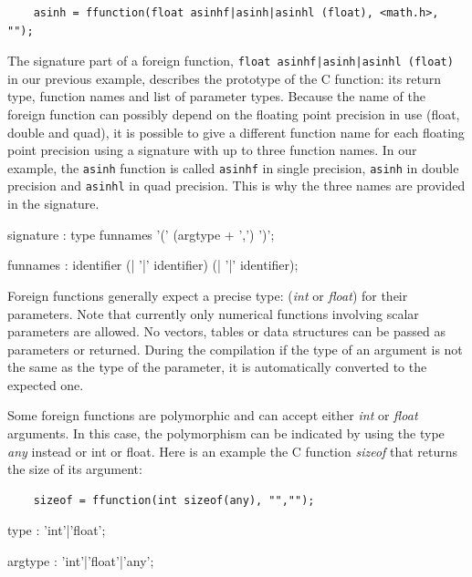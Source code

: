 \begin{lstlisting}
	asinh = ffunction(float asinhf|asinh|asinhl (float), <math.h>, "");
\end{lstlisting}


The signature part of a foreign function, \lstinline'float asinhf|asinh|asinhl (float)' in our previous example, describes the prototype of the C function: its return type, function names and list of parameter types. Because the name of the foreign function can possibly depend on the floating point precision in use (float, double and quad), it is possible to give a different function name for each floating point precision using a signature with up to three function names. In our example, the \lstinline'asinh' function is called \lstinline'asinhf' in single precision, \lstinline'asinh' in double precision and \lstinline'asinhl' in quad precision. This is why the three names are provided in the signature.


\begin{rail}
signature : type funnames '(' (argtype + ',') ')';
\end{rail}

\begin{rail}
funnames : identifier (| '|' identifier) (| '|' identifier);
\end{rail}

Foreign functions generally expect a precise type: (\textit{int} or \textit{float}) for their parameters. Note that currently only numerical functions involving scalar parameters are allowed. No vectors, tables or data structures can be passed as parameters or returned. During the compilation if the type of an argument is not the same as the type of the parameter, it is automatically converted to the expected one.

Some foreign functions are polymorphic and can accept either \textit{int} or \textit{float} arguments. In this case, the polymorphism can be indicated by using the type \textit{any} instead or int or float. Here is an example the C function \textit{sizeof} that returns the size of its argument:

\begin{lstlisting}
	sizeof = ffunction(int sizeof(any), "","");
\end{lstlisting}

\begin{rail}
	type : 'int'|'float';
\end{rail}

\begin{rail}
	argtype : 'int'|'float'|'any';
\end{rail}

